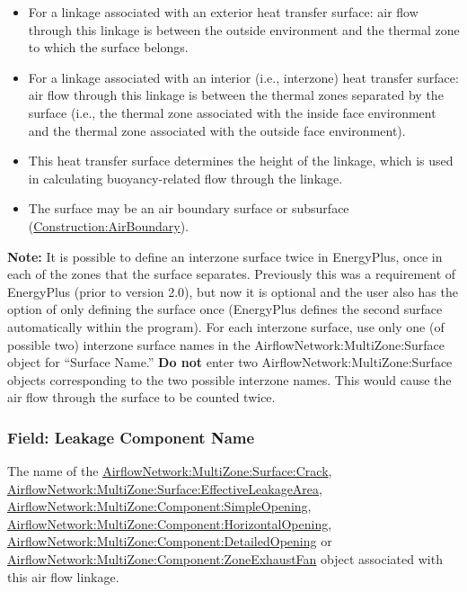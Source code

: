 \begin{itemize}
\item
For a linkage associated with an exterior heat transfer surface: air flow through this linkage is between the outside environment and the thermal zone to which the surface belongs.

\item
For a linkage associated with an interior (i.e., interzone) heat transfer surface: air flow through this linkage is between the thermal zones separated by the surface (i.e., the thermal zone associated with the inside face environment and the thermal zone associated with the outside face environment).

\item
This heat transfer surface determines the height of the linkage, which is used in calculating buoyancy-related flow through the linkage.

\item
The surface may be an air boundary surface or subsurface (\hyperref[constructionairboundary]{Construction:AirBoundary}).
\end{itemize}

\textbf{Note:} It is possible to define an interzone surface twice in EnergyPlus, once in each of the zones that the surface separates. Previously this was a requirement of EnergyPlus (prior to version 2.0), but now it is optional and the user also has the option of only defining the surface once (EnergyPlus defines the second surface automatically within the program). For each interzone surface, use only one (of possible two) interzone surface names in the AirflowNetwork:MultiZone:Surface object for ``Surface Name.'' \textbf{Do not} enter two AirflowNetwork:MultiZone:Surface objects corresponding to the two possible interzone names. This would cause the air flow through the surface to be counted twice.

\subsubsection{Field: Leakage Component Name}\label{field-leakage-component-name}

The name of the \hyperref[airflownetworkmultizonesurfacecrack]{AirflowNetwork:MultiZone:Surface:Crack}, \hyperref[airflownetworkmultizonesurfaceeffectiveleakagearea]{AirflowNetwork:MultiZone:Surface:EffectiveLeakageArea}, \hyperref[airflownetworkmultizonecomponentsimpleopening]{AirflowNetwork:MultiZone:Component:SimpleOpening}, \hyperref[airflownetworkmultizonecomponenthorizontalopening]{AirflowNetwork:MultiZone:Component:HorizontalOpening}, \hyperref[airflownetworkmultizonecomponentdetailedopening]{AirflowNetwork:MultiZone:Component:DetailedOpening} or \hyperref[airflownetworkmultizonecomponentzoneexhaustfan]{AirflowNetwork:MultiZone:Component:ZoneExhaustFan} object associated with this air flow linkage.

